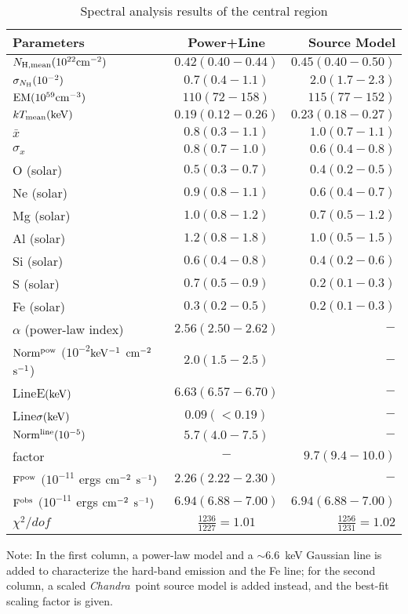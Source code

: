 \documentclass[usenatbib]{mnras}
\def\chandra{{\sl Chandra}}
\begin{document}
\begin{table}%
\caption{Spectral analysis results of the central region}
\label{t:spec-cen}
\begin{tabular}{lcr}
\hline
Parameters & Power+Line & Source Model \\
\hline
$N_{\rm H, mean} (10^{22}\rm{cm}^{-2})$ & $0.42(0.40-0.44)$ &$0.45(0.40-0.50)$\\
$\sigma_{N_{\rm H}} (10^{-2})$ & $0.7(0.4-1.1)$ &$2.0(1.7-2.3)$\\

$\rm{EM(10^{59}cm^{-3})}$ & $110(72-158)$&$115(77-152)$ \\
$kT_{\rm mean}(\rm{keV})$ & $0.19(0.12-0.26)$ &$0.23(0.18-0.27)$\\
$\bar{x}\ $ &$0.8(0.3-1.1)$ &$1.0(0.7-1.1)$\\
$\sigma_x$ & $0.8(0.7-1.0)$ &$0.6(0.4-0.8)$\\
O (solar)& $0.5(0.3-0.7)$ &$0.4(0.2-0.5)$\\
Ne (solar)& $0.9(0.8-1.1)$ &$0.6(0.4-0.7)$\\
Mg (solar)& $1.0(0.8-1.2)$ &$0.7(0.5-1.2)$\\ 
Al (solar)& $1.2(0.8-1.8)$ &$1.0(0.5-1.5)$\\
Si (solar)& $0.6(0.4-0.8)$ &$0.4(0.2-0.6)$\\
S (solar)& $0.7(0.5-0.9)$ &$0.2(0.1-0.3)$\\
Fe (solar)& $0.3(0.2-0.5)$ &$0.2(0.1-0.3)$\\
$\alpha$ (power-law index)& $2.56(2.50-2.62)$ &$-$\\
$\rm{Norm^{pow}}$ $(10^{-2}$$\rm{keV^{-1}}$ $\rm{cm^{-2}}$ $\rm{s^{-1}}$)& $2.0(1.5-2.5)$  &$-$\\
LineE$(\rm{keV})$ & $6.63(6.57-6.70)$ & $-$ \\
Line$\sigma(\rm{keV})$ &$0.09(<0.19)$ & $-$ \\
$\rm{Norm^{line}}(10^{-5})$ &$5.7(4.0-7.5)$ & $-$ \\
factor & $-$ & $9.7(9.4-10.0)$ \\
$\rm{F^{pow}}$ $(10^{-11}$ ergs $\rm{cm^{-2}}$ $\rm{s^{-1})}$ & $2.26(2.22-2.30)$& $-$
\\ 
$\rm{F^{obs}}$ $(10^{-11}$ ergs $\rm{cm^{-2}}$ $\rm{s^{-1})}$ & $6.94(6.88-7.00)$& $6.94(6.88-7.00)$
\\ 
$\chi^2/dof$ & $\frac{1236}{1227}=1.01$ &$\frac{1256}{1231}=1.02$\\
\hline
\end{tabular}

Note: In the first column, a power-law model and a $\sim6.6$~keV Gaussian line is added to characterize the hard-band emission and the Fe line; for the second column, a scaled \chandra\ point source model is added instead, and the best-fit scaling factor is given.

\vspace{0.5cm}
\end{table}
\end{document}

